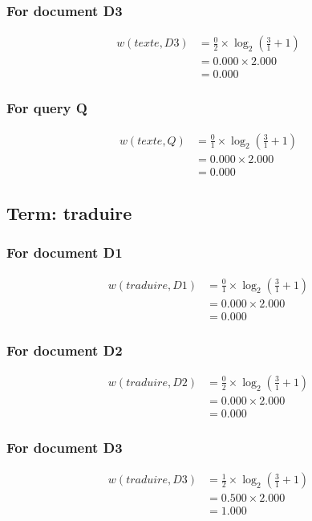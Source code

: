 \documentclass{article}
\begin{document}
\subsubsection*{For document D3}
\begin{align}
w(texte, D3) &= \frac{0}{2} \times \log_{2}\left(\frac{3}{1} + 1\right) \\
&= 0.000 \times 2.000 \\
&= 0.000
\end{align}

\subsubsection*{For query Q}
\begin{align}
w(texte, Q) &= \frac{0}{1} \times \log_{2}\left(\frac{3}{1} + 1\right) \\
&= 0.000 \times 2.000 \\
&= 0.000
\end{align}

\subsection{Term: traduire}
\subsubsection*{For document D1}
\begin{align}
w(traduire, D1) &= \frac{0}{1} \times \log_{2}\left(\frac{3}{1} + 1\right) \\
&= 0.000 \times 2.000 \\
&= 0.000
\end{align}

\subsubsection*{For document D2}
\begin{align}
w(traduire, D2) &= \frac{0}{2} \times \log_{2}\left(\frac{3}{1} + 1\right) \\
&= 0.000 \times 2.000 \\
&= 0.000
\end{align}

\subsubsection*{For document D3}
\begin{align}
w(traduire, D3) &= \frac{1}{2} \times \log_{2}\left(\frac{3}{1} + 1\right) \\
&= 0.500 \times 2.000 \\
&= 1.000
\end{align}
\end{document}

